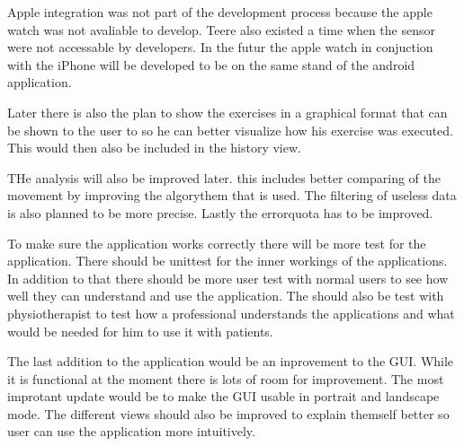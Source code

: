 Apple integration was not part of the development process because the apple watch was not avaliable to develop. Teere also existed a time when the sensor were not accessable by developers. In the futur the apple watch in conjuction with the iPhone will be developed to be on the same stand of the android application.

Later there is also the plan to show the exercises in a graphical format that can be shown to the user to so he can better visualize how his exercise was executed. This would then also be included in the history view. 

THe analysis will also be improved later. this includes better comparing of the movement by improving the algorythem that is used. The filtering of useless data is also planned to be more precise. Lastly the errorquota has to be improved.

To make sure the application works correctly there will be more test for the application. There should be  unittest for the inner workings of the applications. In addition to that there should be more user test with normal users to see how well they can understand and use the application. The should also be test with physiotherapist to test how a professional understands the applications and what would be needed for him to use it with patients.

The last addition to the application would be an inprovement to the GUI. While it is functional at the moment there is lots of room for improvement. The most improtant update would be to make the GUI usable in portrait and landscape mode. The different views should also be improved to explain themself better so user can use the application more intuitively.